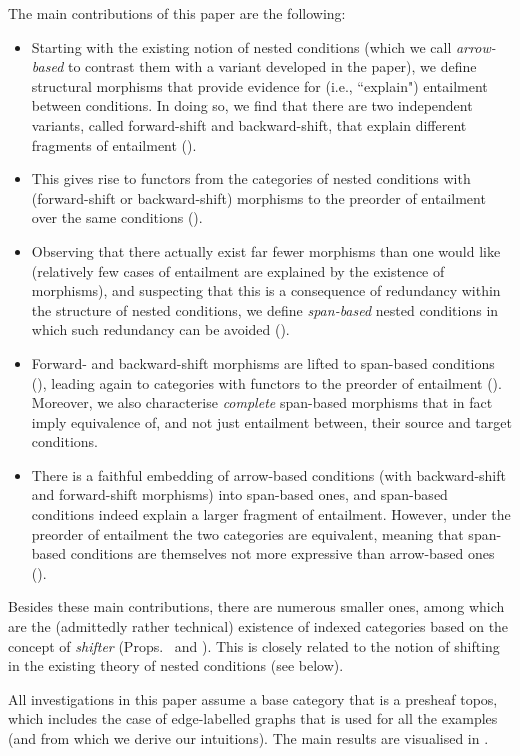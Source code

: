 The main contributions of this paper are the following:

\begin{itemize}
\item Starting with the existing notion of nested conditions (which we call \emph{arrow-based} to contrast them with a variant developed in the paper), we define structural morphisms that provide evidence for (i.e., ``explain") entailment between conditions. In doing so, we find that there are two independent variants, called forward-shift and backward-shift, that explain different fragments of entailment ().

\item This gives rise to functors from the categories of nested conditions with (forward-shift or backward-shift) morphisms to the preorder of entailment over the same conditions ().

\item Observing that there actually exist far fewer morphisms than one would like (relatively few cases of entailment are explained by the existence of morphisms), and suspecting that this is a consequence of redundancy within the structure of nested conditions, we define \emph{span-based} nested conditions in which such redundancy can be avoided ().

\item Forward- and backward-shift morphisms are lifted to span-based conditions (), leading again to categories with functors to the preorder of entailment (). Moreover, we also characterise \emph{complete} span-based morphisms that in fact imply equivalence of, and not just entailment between, their source and target conditions.

\item There is a faithful embedding of arrow-based conditions (with backward-shift and forward-shift morphisms) into span-based ones, and span-based conditions indeed explain a larger fragment of entailment. However, under the preorder of entailment the two categories are equivalent, meaning that span-based conditions are themselves not more expressive than arrow-based ones ().
\end{itemize}
%
Besides these main contributions, there are numerous smaller ones, among which are the (admittedly rather technical) existence of indexed categories based on the concept of \emph{shifter} (Props.\  and ). This is closely related to the notion of shifting in the existing theory of nested conditions (see below).

All investigations in this paper assume a base category that is a presheaf topos, which includes the case of edge-labelled graphs that is used for all the examples (and from which we derive our intuitions). The main results are visualised in .
